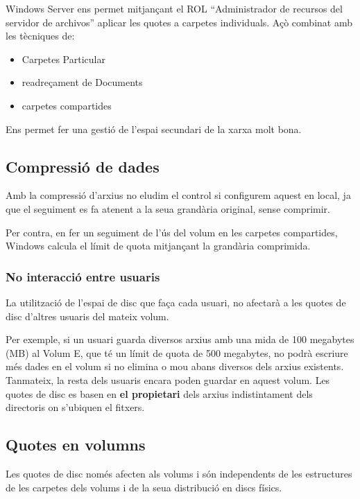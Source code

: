 \documentclass[
  a4paper,
]{article}
\providecommand{\tightlist}{%
  \setlength{\itemsep}{0pt}\setlength{\parskip}{0pt}}
\begin{document}
Windows Server ens permet mitjançant el ROL ``Administrador de recursos
del servidor de archivos'' aplicar les quotes a carpetes individuals.
Açò combinat amb les tècniques de:

\begin{itemize}
\tightlist
\item
  Carpetes Particular
\item
  readreçament de Documents
\item
  carpetes compartides
\end{itemize}

Ens permet fer una gestió de l'espai secundari de la xarxa molt bona.

\subsection{Compressió de dades}\label{compressiuxf3-de-dades}

Amb la compressió d'arxius no eludim el control si configurem aquest en
local, ja que el seguiment es fa atenent a la seua grandària original,
sense comprimir.

Per contra, en fer un seguiment de l'ús del volum en les carpetes
compartides, Windows calcula el límit de quota mitjançant la grandària
comprimida.

\subsubsection{No interacció entre
usuaris}\label{no-interacciuxf3-entre-usuaris}

La utilització de l'espai de disc que faça cada usuari, no afectarà a
les quotes de disc d'altres usuaris del mateix volum.

Per exemple, si un usuari guarda diversos arxius amb una mida de 100
megabytes (MB) al Volum E, que té un límit de quota de 500 megabytes, no
podrà escriure més dades en el volum si no elimina o mou abans diversos
dels arxius existents. Tanmateix, la resta dels usuaris encara poden
guardar en aquest volum. Les quotes de disc es basen en \textbf{el
propietari} dels arxius indistintament dels directoris on s'ubiquen el
fitxers.

\subsection{Quotes en volumns}\label{quotes-en-volumns}

Les quotes de disc només afecten als volums i són independents de les
estructures de les carpetes dels volums i de la seua distribució en
discs físics.
\end{document}
